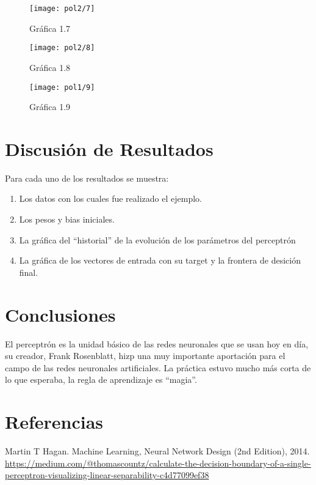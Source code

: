 \documentclass{article}
\begin{document}
\begin{figure}[htpb]
	\centering
	\texttt{[image: pol2/7]}
	\caption{Gráfica 1.7}
\end{figure}

\begin{figure}[htpb]
	\centering
	\texttt{[image: pol2/8]}
	\caption{Gráfica 1.8}
\end{figure}

\begin{figure}[htpb]
	\centering
	\texttt{[image: pol1/9]}
	\caption{Gráfica 1.9}
\end{figure}
\newpage
\section{Discusión de Resultados}
Para cada uno de los resultados se muestra:
\begin{enumerate}
	\item Los datos con los cuales fue realizado el ejemplo.
	\item Los pesos y bias iniciales.
	\item La gráfica del ``historial'' de la evolución de los parámetros del perceptrón
	\item La gráfica de los vectores de entrada con su target y la frontera de desición final.
\end{enumerate}
\section{Conclusiones}
El perceptrón es la unidad básico de las redes neuronales que se usan hoy en día, su creador,  Frank Rosenblatt,  hizp una muy importante aportación para el campo de las redes neuronales artificiales. 
La práctica estuvo mucho más corta de lo que esperaba, la regla de aprendizaje es ``magia''. 
\section{Referencias}
Martin T Hagan. Machine Learning, Neural Network Design (2nd Edition), 2014.\\
\url{https://medium.com/@thomascountz/calculate-the-decision-boundary-of-a-single-perceptron-visualizing-linear-separability-c4d77099ef38}
\end{document}
